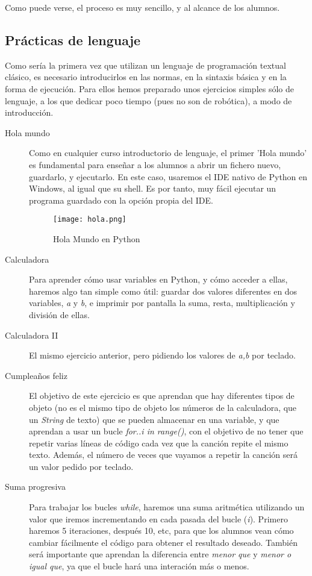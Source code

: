 Como puede verse, el proceso es muy sencillo, y al alcance de los alumnos. 
\subsection{Prácticas de lenguaje}
Como sería la primera vez que utilizan un lenguaje de programación textual clásico, es necesario introducirlos en las normas, en la sintaxis básica y en la forma de ejecución. Para ellos hemos preparado unos ejercicios simples sólo de lenguaje, a los que dedicar poco tiempo (pues no son de robótica), a modo de introducción.
\begin{description}
\item [Hola mundo] Como en cualquier curso introductorio de lenguaje, el primer 'Hola mundo' es fundamental para enseñar a los alumnos a abrir un fichero nuevo, guardarlo, y ejecutarlo. En este caso, usaremos el IDE nativo de Python en Windows, al igual que su shell. Es por tanto, muy fácil ejecutar un programa guardado con la opción propia del IDE.
	\begin{figure}[H]
		\texttt{[image: hola.png]}
		\centering
		\label{img:holamundo}
		\caption{Hola Mundo en Python}
	\end{figure}
\item [Calculadora] Para aprender cómo usar variables en Python, y cómo acceder a ellas, haremos algo tan simple como útil: guardar dos valores diferentes en dos variables, \textit{a} y \textit{b}, e imprimir por pantalla la suma, resta, multiplicación y división de ellas. 
\item[Calculadora II] El mismo ejercicio anterior, pero pidiendo los valores de \textit{a,b} por teclado. 
\item[Cumpleaños feliz] El objetivo de este ejercicio es que aprendan que hay diferentes tipos de objeto (no es el mismo tipo de objeto los números de la calculadora, que un \textit{String} de texto) que se pueden almacenar en una variable, y que aprendan a usar un bucle \textit{for..i in range()}, con el objetivo de no tener que repetir varias líneas de código cada vez que la canción repite el mismo texto. Además, el número de veces que vayamos a repetir la canción será un valor pedido por teclado.
\item [Suma progresiva] Para trabajar los bucles \textit{while}, haremos una suma aritmética utilizando un valor que iremos incrementando en cada pasada del bucle (\textit{i}). Primero haremos 5 iteraciones, después 10, etc, para que los alumnos vean cómo cambiar fácilmente el código para obtener el resultado deseado. También será importante que aprendan la diferencia entre \textit{menor que} y \textit{menor o igual que}, ya que el bucle hará una interación más o menos.

\end{description}
